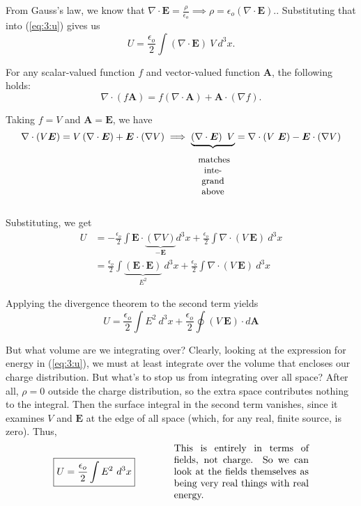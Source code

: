 \documentclass{article}
\begin{document}
\vspace{1em}

From Gauss's law, we know that $\displaystyle \nabla \cdot \bm{E} = \frac{\rho}{\epsilon_o} \implies \rho = \epsilon_o \left( \nabla \cdot \bm{E} \right).$. Substituting that into (\ref{eq:3:u}) gives us
\begin{equation*}
    U = \frac{\epsilon_o}{2} \int \left( \nabla \cdot \bm{E} \right)\ V\ d^3x.
\end{equation*}

For any scalar-valued function $f$ and vector-valued function $\bm{A}$, the following holds:
\begin{equation*}
    \nabla \cdot \left( f \bm{A} \right) = f \left( \nabla \cdot \bm{A} \right) + \bm{A} \cdot \left( \nabla f \right).
\end{equation*}

Taking $f = V$ and $\bm{A} = \bm{E}$, we have
\begin{equation*}
    \nabla \cdot \left( V \bm{E} \right) = V \left( \nabla \cdot \bm{E} \right) + \bm{E} \cdot \left( \nabla V \right) \implies \underbrace{\left( \nabla \cdot \bm{E} \right)\ V}_{\parbox[c]{0.088\textwidth}{\vspace{-0.28cm}\begin{center} \small matches integrand above \end{center}}} = \nabla \cdot \left( V\ \bm{E} \right) - \bm{E} \cdot \left( \nabla V \right)
\end{equation*}

Substituting, we get
\begin{align*}
    U &= -\frac{\epsilon_o}{2} \int \bm{E} \cdot \underbrace{\left( \nabla V \right)}_{\displaystyle -\bm{E}} d^3x + \frac{\epsilon_o}{2} \int \nabla \cdot \left( V\ \bm{E} \right)\ d^3x \\
    &= \frac{\epsilon_o}{2} \int \underbrace{\left( \bm{E} \cdot \bm{E} \right)}_{\displaystyle E^2}\ d^3x + \frac{\epsilon_o}{2} \int \nabla \cdot \left( V\ \bm{E} \right)\ d^3x
\end{align*}

Applying the divergence theorem to the second term yields
\begin{equation*}
    U = \frac{\epsilon_o}{2} \int E^2\ d^3x + \frac{\epsilon_o}{2} \oint \left( V\ \bm{E} \right) \cdot d\bm{A}
\end{equation*}

But what volume are we integrating over? Clearly, looking at the expression for energy in (\ref{eq:3:u}), we must at least integrate over the volume that encloses our charge distribution. But what's to stop us from integrating over all space? After all, $\rho = 0$ outside the charge distribution, so the extra space contributes nothing to the integral. Then the surface integral in the second term vanishes, since it examines $V$ and $\bm{E}$ at the edge of all space (which, for any real, finite source, is zero). Thus,
\begin{equation*}
    \boxed{U = \frac{\epsilon_o}{2} \int E^2\ d^3x} \qquad\qquad \parbox[c]{0.4\textwidth}{This is entirely in terms of fields, not charge. So we can look at the fields themselves as being very real things with real energy.}
\end{equation*}
\end{document}
